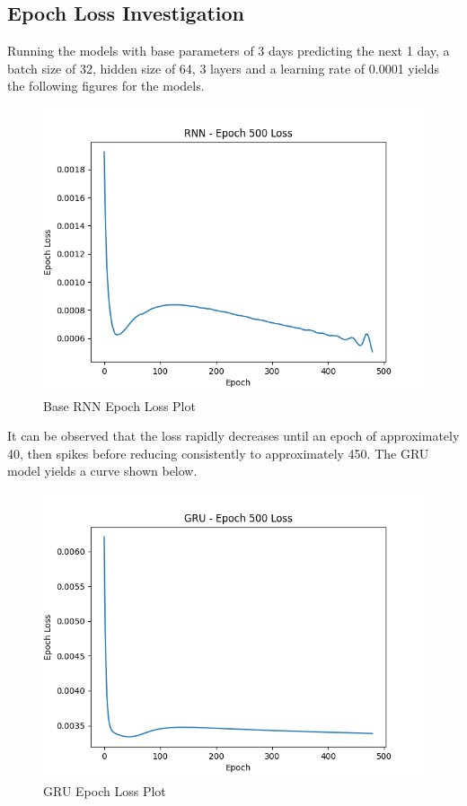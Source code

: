 \documentclass[10pt,twocolumn,letterpaper]{article}
\newcommand{\squeezeup}{\vspace{-10.0mm}}
\begin{document}
\subsection{Epoch Loss Investigation}
Running the models with base parameters of 3 days predicting the next 1 day, a batch size of 
32, hidden size of 64, 3 layers and a learning rate of 0.0001 yields the following 
figures for the models.
\squeezeup
\begin{center}
   \begin{figure}[H]
   \includegraphics[scale=0.5]{RNN-Epoch500_loss.png}
   \caption{Base RNN Epoch Loss Plot }
   \end{figure}
 \end{center}
 \squeezeup

It can be observed that the loss rapidly decreases until an epoch of approximately 40, then 
spikes before reducing consistently to approximately 450. The GRU model yields a curve shown
below.

\begin{center}
   \begin{figure}[H]
   \includegraphics[scale=0.5]{GRU-Epoch500_loss.png}
   \caption{GRU Epoch Loss Plot }
   \end{figure}
 \end{center}
 \squeezeup
\end{document}
